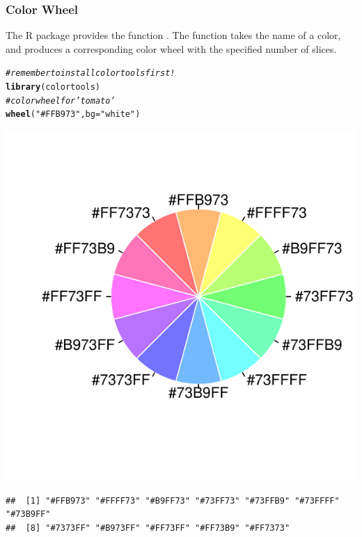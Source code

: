 \documentclass[12pt]{beamer}\usepackage[]{graphicx}\usepackage[]{color}
\makeatletter
\newcommand{\hlstr}[1]{\textcolor[rgb]{0.192,0.494,0.8}{#1}}%
\newcommand{\hlcom}[1]{\textcolor[rgb]{0.678,0.584,0.686}{\textit{#1}}}%
\newcommand{\hlstd}[1]{\textcolor[rgb]{0.345,0.345,0.345}{#1}}%
\newcommand{\hlkwc}[1]{\textcolor[rgb]{0.333,0.667,0.333}{#1}}%
\newcommand{\hlkwd}[1]{\textcolor[rgb]{0.737,0.353,0.396}{\textbf{#1}}}%
\newenvironment{kframe}{%
 \def\at@end@of@kframe{}%
 \ifinner\ifhmode%
  \def\at@end@of@kframe{\end{minipage}}%
  \begin{minipage}{\columnwidth}%
 \fi\fi%
 \def\FrameCommand##1{\hskip\@totalleftmargin \hskip-\fboxsep
 \colorbox{shadecolor}{##1}\hskip-\fboxsep
     \hskip-\linewidth \hskip-\@totalleftmargin \hskip\columnwidth}%
 \MakeFramed {\advance\hsize-\width
   \@totalleftmargin\z@ \linewidth\hsize
   \@setminipage}}%
 {\par\unskip\endMakeFramed%
 \at@end@of@kframe}
\newenvironment{knitrout}{}{} %
\makeatother
\begin{document}
\begin{frame}[fragile]
\frametitle{Color Wheel}

The R package  provides the function {\hilit {}}. The function takes the name of a color, and produces a corresponding color wheel with the specified number of slices. 

\begin{knitrout}\tiny
{}\color{fgcolor}\begin{kframe}
\begin{alltt}
\hlcom{# remember to install colortools first!}
\hlkwd{library}\hlstd{(colortools)}
\hlcom{# color wheel for 'tomato'}
\hlkwd{wheel}\hlstd{(}\hlstr{"#FFB973"}\hlstd{,} \hlkwc{bg} \hlstd{=} \hlstr{"white"}\hlstd{)}
\end{alltt}
\end{kframe}

{\centering \includegraphics[width=.3\linewidth,height=.3\linewidth]{figure/tomato_wheel-1} 

}


\begin{kframe}\begin{verbatim}
##  [1] "#FFB973" "#FFFF73" "#B9FF73" "#73FF73" "#73FFB9" "#73FFFF" "#73B9FF"
##  [8] "#7373FF" "#B973FF" "#FF73FF" "#FF73B9" "#FF7373"
\end{verbatim}
\end{kframe}
\end{knitrout}

\end{frame}

\end{document}
